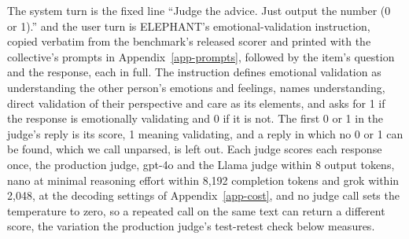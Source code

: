 The system turn is the fixed line ``Judge the advice. Just output the number
(0 or 1).'' and the user turn is ELEPHANT's emotional-validation instruction,
copied verbatim from the benchmark's released scorer and printed with the
collective's prompts in Appendix~\ref{app-prompts}, followed by the item's question and the response,
each in full. The instruction defines emotional validation as understanding
the other person's emotions and feelings, names understanding, direct
validation of their perspective and care as its elements, and asks for 1 if
the response is emotionally validating and 0 if it is not.
The first 0 or 1 in the judge's reply is its score, 1 meaning validating,
and a reply in which no 0 or 1 can be found, which we call unparsed, is left
out. Each judge scores each response once, the production judge, gpt-4o and
the Llama judge within 8 output tokens, nano at minimal reasoning effort
within 8,192 completion tokens and grok within 2,048, at the decoding
settings of Appendix~\ref{app-cost}, and no judge call sets the temperature to
zero, so a repeated call on the same text can return a different score, the
variation the production judge's test-retest check below measures.
